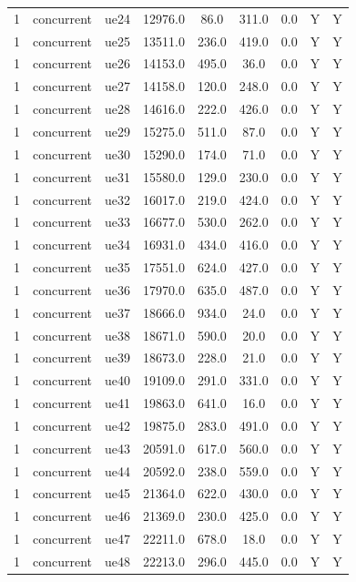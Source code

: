 \begin{table}[ht]
\begin{tabular}{|c|c|c|c|c|c|c|c|c|}
1 & concurrent & ue24 & 12976.0 & 86.0 & 311.0 & 0.0 & Y & Y \\
1 & concurrent & ue25 & 13511.0 & 236.0 & 419.0 & 0.0 & Y & Y \\
1 & concurrent & ue26 & 14153.0 & 495.0 & 36.0 & 0.0 & Y & Y \\
1 & concurrent & ue27 & 14158.0 & 120.0 & 248.0 & 0.0 & Y & Y \\
1 & concurrent & ue28 & 14616.0 & 222.0 & 426.0 & 0.0 & Y & Y \\
1 & concurrent & ue29 & 15275.0 & 511.0 & 87.0 & 0.0 & Y & Y \\
1 & concurrent & ue30 & 15290.0 & 174.0 & 71.0 & 0.0 & Y & Y \\
1 & concurrent & ue31 & 15580.0 & 129.0 & 230.0 & 0.0 & Y & Y \\
1 & concurrent & ue32 & 16017.0 & 219.0 & 424.0 & 0.0 & Y & Y \\
1 & concurrent & ue33 & 16677.0 & 530.0 & 262.0 & 0.0 & Y & Y \\
1 & concurrent & ue34 & 16931.0 & 434.0 & 416.0 & 0.0 & Y & Y \\
1 & concurrent & ue35 & 17551.0 & 624.0 & 427.0 & 0.0 & Y & Y \\
1 & concurrent & ue36 & 17970.0 & 635.0 & 487.0 & 0.0 & Y & Y \\
1 & concurrent & ue37 & 18666.0 & 934.0 & 24.0 & 0.0 & Y & Y \\
1 & concurrent & ue38 & 18671.0 & 590.0 & 20.0 & 0.0 & Y & Y \\
1 & concurrent & ue39 & 18673.0 & 228.0 & 21.0 & 0.0 & Y & Y \\
1 & concurrent & ue40 & 19109.0 & 291.0 & 331.0 & 0.0 & Y & Y \\
1 & concurrent & ue41 & 19863.0 & 641.0 & 16.0 & 0.0 & Y & Y \\
1 & concurrent & ue42 & 19875.0 & 283.0 & 491.0 & 0.0 & Y & Y \\
1 & concurrent & ue43 & 20591.0 & 617.0 & 560.0 & 0.0 & Y & Y \\
1 & concurrent & ue44 & 20592.0 & 238.0 & 559.0 & 0.0 & Y & Y \\
1 & concurrent & ue45 & 21364.0 & 622.0 & 430.0 & 0.0 & Y & Y \\
1 & concurrent & ue46 & 21369.0 & 230.0 & 425.0 & 0.0 & Y & Y \\
1 & concurrent & ue47 & 22211.0 & 678.0 & 18.0 & 0.0 & Y & Y \\
1 & concurrent & ue48 & 22213.0 & 296.0 & 445.0 & 0.0 & Y & Y \\

\end{tabular}
\end{table}
